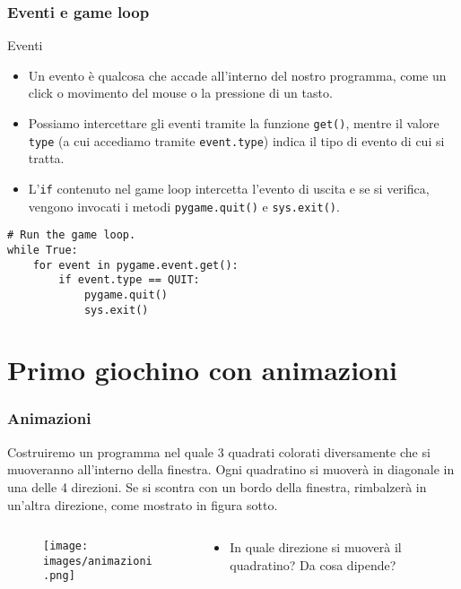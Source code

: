 \documentclass{beamer}
\begin{document}
\begin{frame}[fragile]
\frametitle{Eventi e game loop}
\begin{block}{Eventi}
	\begin{itemize}
		\item Un evento è qualcosa che accade all'interno del nostro programma, come un click o movimento del mouse o la pressione di un tasto.
		\item Possiamo intercettare gli eventi tramite la funzione \texttt{get()}, mentre il valore \texttt{type} (a cui accediamo tramite \texttt{event.type}) indica il tipo di evento di cui si tratta.
		\item L'\texttt{if} contenuto nel game loop intercetta l'evento di uscita e se si verifica, vengono invocati i metodi \texttt{pygame.quit()} e \texttt{sys.exit()}.
	\end{itemize}
\end{block}
\begin{lstlisting}
# Run the game loop.
while True:
    for event in pygame.event.get():
        if event.type == QUIT:
            pygame.quit()
            sys.exit()
\end{lstlisting}
\end{frame}

\section{Primo giochino con animazioni}

\begin{frame}[fragile]
\frametitle{Animazioni}
Costruiremo un programma nel quale 3 quadrati colorati diversamente che si muoveranno all'interno della finestra. Ogni quadratino si muoverà in diagonale in una delle 4 direzioni. Se si scontra con un bordo della finestra, rimbalzerà in un'altra direzione, come mostrato in figura sotto.
\begin{columns}
	\begin{column}[T]{0.5\textwidth}
		\begin{figure}[t]
			\texttt{[image: images/animazioni.png]}
		\end{figure}
	\end{column}
	\begin{column}[T]{0.5\textwidth}
		\begin{itemize}
			\item In quale direzione si muoverà il quadratino? Da cosa dipende?
		\end{itemize}
	\end{column}
\end{columns}
\end{frame}
\end{document}
